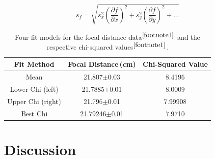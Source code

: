 \documentclass[twocolumn]{aastex6}
\begin{document}
\begin{equation}
s_f=\sqrt{s_x^2\left(\frac{\partial f}{\partial x}\right)^2 + s_y^2\left(\frac{\partial f}{\partial y}\right)^2+ ...}
\label{partial}
\end{equation}


\begin{table}[h]
\begin{center}
\caption{Four fit models for the focal distance data$^{\ref{footnote1}}$ and the respective chi-squared values$^{\ref{footnote1}}$.}

\begin{tabular}{ c | c |c }

Fit Method & Focal Distance\,(cm) & Chi-Squared Value \\ \hline \hline
Mean & 21.807$\pm$0.03 & 8.4196 \\
Lower Chi (left) & 21.7885$\pm$0.01 & 8.0009 \\
Upper Chi (right) & 21.796$\pm$0.01 & 7.99908 \\
Best Chi & 21.79246$\pm$0.01 & 7.9710 \\

\end{tabular}
\label{fits}
\end{center}
\end{table}





\section{Discussion}
\end{document}
